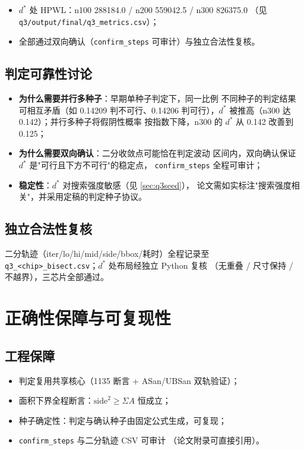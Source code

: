 \documentclass[12pt,a4paper]{article}
\begin{document}
\begin{itemize}
    \item $d^*$ 处 HPWL：n100 288184.0 / n200 559042.5 / n300 826375.0
    （见 \texttt{q3/output/\allowbreak final/q3\_metrics.csv}）；
    \item 全部通过双向确认（\texttt{confirm\_steps} 可审计）与独立合法性复核。
\end{itemize}

\subsection{判定可靠性讨论}

\begin{itemize}
    \item \textbf{为什么需要并行多种子}：早期单种子判定下，同一比例
    不同种子的判定结果可相互矛盾（如 0.14209 判不可行、0.14206
    判可行），$d^*$ 被推高（n300 达 0.142）；并行多种子将假阴性概率
    按指数下降，n300 的 $d^*$ 从 0.142 改善到 0.125；
    \item \textbf{为什么需要双向确认}：二分收敛点可能恰在判定波动
    区间内，双向确认保证 $d^*$ 是"可行且下方不可行"的稳定点，
    \texttt{confirm\_steps} 全程可审计；
    \item \textbf{稳定性}：$d^*$ 对搜索强度敏感（见 \ref{sec:q3seed}），
    论文需如实标注"搜索强度相关"，并采用定稿的判定种子协议。
\end{itemize}

\subsection{独立合法性复核}

二分轨迹（iter/lo/hi/mid/side/bbox/耗时）全程记录至
\texttt{q3\_<chip>\_bisect.csv}；$d^*$ 处布局经独立 Python 复核
（无重叠 / 尺寸保持 / 不越界），三芯片全部通过。

\section{正确性保障与可复现性}

\subsection{工程保障}

\begin{itemize}
    \item 判定复用共享核心（1135 断言 + ASan/UBSan 双轨验证）；
    \item 面积下界全程断言：$\text{side}^2 \ge \Sigma A$ 恒成立；
    \item 种子确定性：判定与确认种子由固定公式生成，可复现；
    \item \texttt{confirm\_steps} 与二分轨迹 CSV 可审计
    （论文附录可直接引用）。
\end{itemize}
\end{document}
